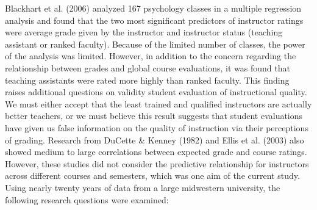 \documentclass[man]{apa6}
\theoremstyle{definition}
\theoremstyle{definition}
\theoremstyle{definition}
\theoremstyle{remark}
\begin{document}
Blackhart et al. (2006) analyzed 167 psychology classes in a multiple
regression analysis and found that the two most significant predictors
of instructor ratings were average grade given by the instructor and
instructor status (teaching assistant or ranked faculty). Because of the
limited number of classes, the power of the analysis was limited.
However, in addition to the concern regarding the relationship between
grades and global course evaluations, it was found that teaching
assistants were rated more highly than ranked faculty. This finding
raises additional questions on validity student evaluation of
instructional quality. We must either accept that the least trained and
qualified instructors are actually better teachers, or we must believe
this result suggests that student evaluations have given us false
information on the quality of instruction via their perceptions of
grading. Research from DuCette \& Kenney (1982) and Ellis et al. (2003)
also showed medium to large correlations between expected grade and
course ratings. However, these studies did not consider the predictive
relationship for instructors across different courses and semesters,
which was one aim of the current study. Using nearly twenty years of
data from a large midwestern university, the following research
questions were examined:
\end{document}
